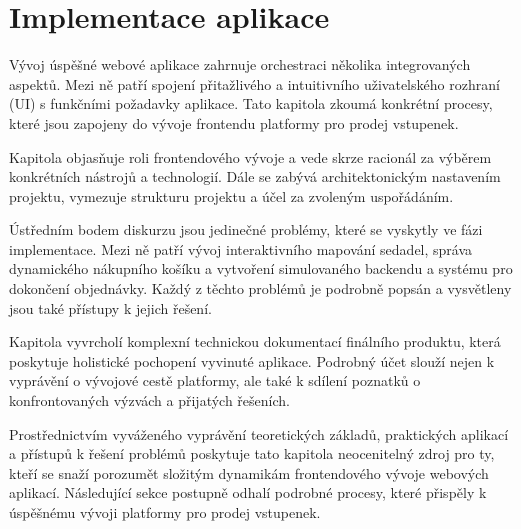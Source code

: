 \chapter{Implementace aplikace}
\label{ch:implementace}
Vývoj úspěšné webové aplikace zahrnuje orchestraci několika integrovaných aspektů.
Mezi ně patří spojení přitažlivého a intuitivního uživatelského rozhraní (UI) s funkčními požadavky aplikace.
Tato kapitola zkoumá konkrétní procesy, které jsou zapojeny do vývoje frontendu platformy pro prodej vstupenek.

Kapitola objasňuje roli frontendového vývoje a vede skrze racionál za výběrem konkrétních nástrojů a technologií.
Dále se zabývá architektonickým nastavením projektu, vymezuje strukturu projektu a účel za zvoleným uspořádáním.

Ústředním bodem diskurzu jsou jedinečné problémy, které se vyskytly ve fázi implementace.
Mezi ně patří vývoj interaktivního mapování sedadel, správa dynamického nákupního košíku a vytvoření simulovaného backendu a systému pro dokončení objednávky.
Každý z těchto problémů je podrobně popsán a vysvětleny jsou také přístupy k jejich řešení.

Kapitola vyvrcholí komplexní technickou dokumentací finálního produktu, která poskytuje holistické pochopení vyvinuté aplikace.
Podrobný účet slouží nejen k vyprávění o vývojové cestě platformy, ale také k sdílení poznatků o konfrontovaných výzvách a přijatých řešeních.

Prostřednictvím vyváženého vyprávění teoretických základů, praktických aplikací a přístupů k řešení problémů poskytuje tato kapitola neocenitelný zdroj pro ty, kteří se snaží porozumět složitým dynamikám frontendového vývoje webových aplikací.
Následující sekce postupně odhalí podrobné procesy, které přispěly k úspěšnému vývoji platformy pro prodej vstupenek.

